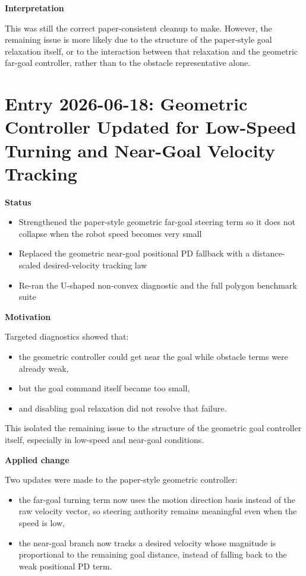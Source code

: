 \documentclass[11pt]{article}
\begin{document}
\textbf{Interpretation}

This was still the correct paper-consistent cleanup to make. However, the
remaining issue is more likely due to the structure of the paper-style goal
relaxation itself, or to the interaction between that relaxation and the
geometric far-goal controller, rather than to the obstacle representative alone.

\section*{Entry 2026-06-18: Geometric Controller Updated for Low-Speed Turning and Near-Goal Velocity Tracking}

\textbf{Status}

\begin{itemize}[leftmargin=*]
  \item Strengthened the paper-style geometric far-goal steering term so it does not collapse when the robot speed becomes very small
  \item Replaced the geometric near-goal positional PD fallback with a distance-scaled desired-velocity tracking law
  \item Re-ran the U-shaped non-convex diagnostic and the full polygon benchmark suite
\end{itemize}

\textbf{Motivation}

Targeted diagnostics showed that:

\begin{itemize}[leftmargin=*]
  \item the geometric controller could get near the goal while obstacle terms were already weak,
  \item but the goal command itself became too small,
  \item and disabling goal relaxation did not resolve that failure.
\end{itemize}

This isolated the remaining issue to the structure of the geometric goal
controller itself, especially in low-speed and near-goal conditions.

\textbf{Applied change}

Two updates were made to the paper-style geometric controller:

\begin{itemize}[leftmargin=*]
  \item the far-goal turning term now uses the motion direction basis instead of
  the raw velocity vector, so steering authority remains meaningful even when
  the speed is low,
  \item the near-goal branch now tracks a desired velocity whose magnitude is
  proportional to the remaining goal distance, instead of falling back to the
  weak positional PD term.
\end{itemize}
\end{document}
